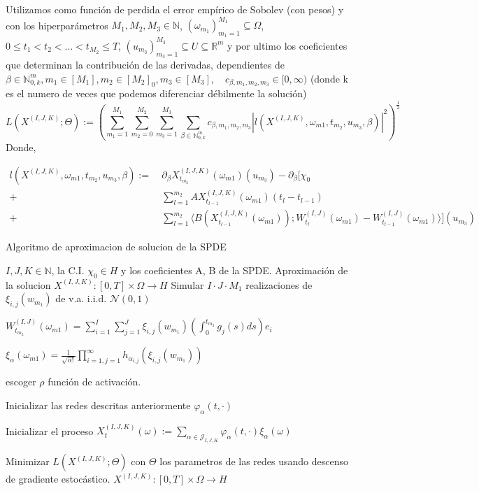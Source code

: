 Utilizamos como función de perdida el error empírico de Sobolev (con pesos) y con los hiperparámetros $M_1,M_2, M_3 \in \mathbb{N}$, $(\omega_{m_1})_{m_1=1}^{M_1} \subseteq \Omega$, $0 \leq t_1 < t_2 < \dots < t_{M_2} \leq T$, $(u_{m_3})_{m_3=1}^{M_3} \subseteq U \subseteq \mathbb{R}^m$ y por ultimo los coeficientes que determinan la contribución de las derivadas, dependientes de $\beta \in \mathbb{N}_{0,k}^m,m_1 \in [M_1],m_2 \in [M_2]_0, m_3 \in [M_3],\quad c_{\beta,m_1,m_2,m_3} \in [0,\infty)$  (donde k es el numero de veces que podemos diferenciar débilmente la solución)
\[
  L(X^{(I,J,K)};\Theta) := (\sum_{m_1=1}^{M_1}\sum_{m_2=0}^{M_2}\sum_{m_3=1}^{M_3}\sum_{\beta \in \mathbb{N}_{0,k}^m} c_{\beta,m_1,m_2,m_3} |l(X^{(I,J,K)},\omega_{m1},t_{m_2},u_{m_3},\beta)|^2)^{\frac{1}{2}}
\]
Donde,

\begin{align*}
  l(X^{(I,J,K)},\omega_{m1},t_{m_2},u_{m_3},\beta) :=\ & \partial_{\beta}X^{(I,J,K)}_{t_{m_2}}(\omega_{m1})(u_{m_3}) - \partial_{\beta}[\chi_0\\
    +\ & \sum_{l=1}^{m_2} AX^{(I,J,K)}_{t_{l-1}}(\omega_{m1}) (t_{l} - t_{l-1})\\
  +\ & \sum_{l=1}^{m_2} \langle B(X^{(I,J,K)}_{t_{l-1}}(\omega_{m1})); W^{(I,J)}_{t_{l}}(\omega_{m1}) - W^{(I,J)}_{t_{l-1}}(\omega_{m1}) \rangle ](u_{m_3})
\end{align*}

\begin{algorithm}
  \caption{Algoritmo de aproximacion de solucion de la SPDE}
  \label{alg:algoritmo_redes}
  \begin{algorithmic}[1]
    \Require $I,J,K \in \mathbb{N}$, la C.I. $\chi_0 \in H$ y los coeficientes A, B de la SPDE.
    \Ensure Aproximación de la solucion $X^{(I,J,K)}: [0,T] \times \Omega \rightarrow H$
    \State Simular $I \cdot J \cdot M_1 $ realizaciones de $\xi_{i,j}(w_{m_1})$ de v.a. i.i.d. $\mathcal{N}(0,1)$

    \State $W^{(I,J)}_{t_{m_2}}(\omega_{m1}) = \sum_{i=1}^{I}\sum_{j=1}^{J}\xi_{i,j}(w_{m_1})(\int_0^{t_{m_2}}g_j(s)ds) e_i$
    \EndFor

    \State $\xi_{\alpha}(\omega_{m1}) = \frac{1}{\sqrt{\alpha!}} \prod_{i=1,j=1}^{\infty} h_{\alpha_{i,j}}(\xi_{i,j}(w_{m_1}))$
    \EndFor

    \State escoger $\rho$ función de activación.

    \State Inicializar las redes descritas anteriormente $\varphi_{\alpha}(t,\cdot)$
    \EndFor

    \State Inicializar el proceso $X_t^{(I,J,K)}(\omega) := \sum_{\alpha \in \mathcal{J}_{I, J, K}} \varphi_\alpha(t, \cdot) \xi_\alpha(\omega)$

    \State Minimizar $L(X^{(I,J,K)};\Theta)$ con $\Theta$ los parametros de las redes usando descenso de gradiente estocástico.
    \State \Return $X^{(I,J,K)}: [0,T] \times \Omega \rightarrow H$
  \end{algorithmic}
\end{algorithm}
